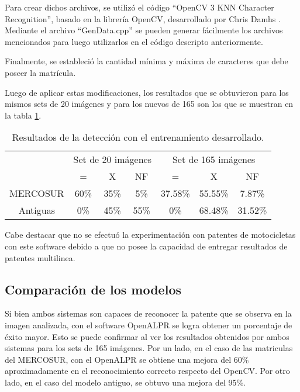 Para crear dichos archivos, se utilizó el código ``OpenCV 3 KNN Character Recognition'',  basado en la librería OpenCV, desarrollado por Chris Damhs \cite{opencv3KNN}. 	Mediante el archivo ``GenData.cpp'' se pueden generar fácilmente los archivos mencionados para luego utilizarlos en el código descripto anteriormente.

Finalmente, se estableció la cantidad mínima y máxima de caracteres que debe poseer la matrícula.
	
Luego de aplicar estas modificaciones, los resultados que se obtuvieron para los mismos sets de 20 imágenes y para los nuevos de 165 son los que se muestran en la tabla \ref{tabla:opencv_Tdesarrollado}.

\begin{table}[htb]
	\centering
	\resizebox{14cm}{!} {
		\begin{tabular}{|c|c|c|c|c|c|c|}
			\hline
			& \multicolumn{3}{c|}{Set de 20 imágenes} & \multicolumn{3}{c|}{Set de 165 imágenes}\\
			\cline{2-7}
			& = & X & NF & = & X & NF\\
			\hline \hline
			MERCOSUR & 60\% & 35\% & 5\% & 37.58\% & 55.55\% & 7.87\%\\ \cline{1-7}
			Antiguas & 0\% & 45\% & 55\% & 0\% & 68.48\% & 31.52\%\\ \cline{1-7}
		\end{tabular}
	}
	\caption{Resultados de la detección con el entrenamiento desarrollado.}
	\label{tabla:opencv_Tdesarrollado}
\end{table}	
	
Cabe destacar que no se efectuó la experimentación con patentes de motocicletas con este software debido a que no posee la capacidad de entregar resultados de patentes multilinea.	
	
\subsection{Comparación de los modelos}		
	
Si bien ambos sistemas son capaces de reconocer la patente que se observa en la imagen analizada, con el software OpenALPR se logra obtener un porcentaje de éxito mayor. Esto se puede confirmar al ver los resultados obtenidos por ambos sistemas para los sets de 165 imágenes. Por un lado, en el caso de las matriculas del MERCOSUR, con el OpenALPR se obtiene una mejora del 60\% aproximadamente en el reconocimiento correcto respecto del OpenCV. Por otro lado, en el caso del modelo antiguo, se obtuvo una mejora del 95\%.

